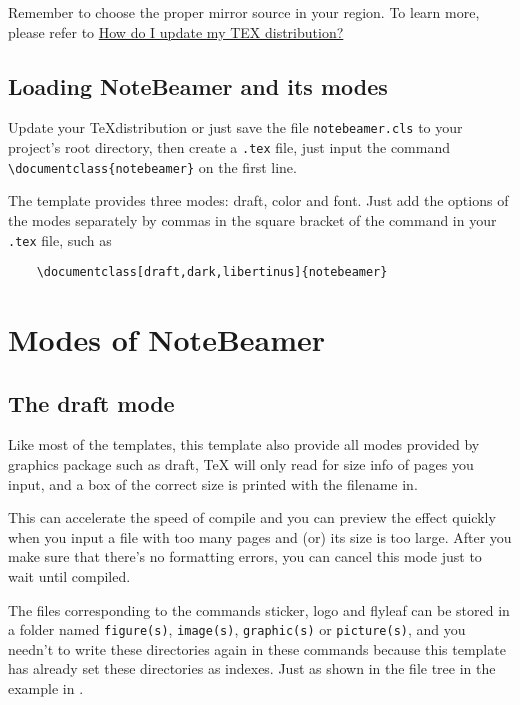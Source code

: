 \documentclass[11pt]{article}
\makeatletter
\def\@pkg#1{\texorpdfstring{\href{https://www.ctan.org/pkg/#1}{\textcolor{pkgcolor}{\textsf{#1}}}}{“#1”}}
\def\s@pkg#1{\texorpdfstring{\textcolor{pkgcolor}{\textsf{#1}}}{“#1”}}
\DeclareRobustCommand\pkg{\@ifstar\s@pkg\@pkg}
\def\mode#1{\texorpdfstring{\textcolor{moducolor}{\textsf{#1}}}{“#1”}}
\def\cmd#1{\texorpdfstring{\textcolor{cmdcolor}{\textsf{#1}}}{“#1”}}
\makeatother
\begin{document}
Remember to choose the proper mirror source in your region. To learn more, please refer to \href{https://tex.stackexchange.com/questions/55437/how-do-i-update-my-tex-distribution}{How do I update my TEX distribution?}

\subsection{Loading \pkg{NoteBeamer} and its modes}
Update your \sffamily\TeX distribution or just save the file \verb|notebeamer.cls| to your project's root directory, then create a \verb|.tex| file, just input the command \verb|\documentclass{notebeamer}| on the first line.

The template provides three modes: \mode{draft}, \mode{color} and \mode{font}. Just add the options of the modes separately by commas in the square bracket of the command in your \verb|.tex| file, such as

\begin{verbatim}
    \documentclass[draft,dark,libertinus]{notebeamer}
\end{verbatim}

\section{Modes of \pkg{NoteBeamer}}


\subsection{The \mode{draft} mode}
Like most of the templates, this template also provide all modes provided by \pkg{graphics} package such as \mode{draft}, \sffamily\TeX{} will only read for size info of pages you input, and a box of the correct size is printed with the filename in.

This can accelerate the speed of compile and you can preview the effect quickly when you input a file with too many pages and (or) its size is too large. After you make sure that there's no formatting errors, you can cancel this mode just to wait until compiled.

The files corresponding to the commands \cmd{sticker}, \cmd{logo} and \cmd{flyleaf} can be stored in a folder named \verb|figure(s)|, \verb|image(s)|, \verb|graphic(s)| or \verb|picture(s)|, and you needn't to write these directories again in these commands because this template has already set these directories as indexes. Just as shown in the file tree in the example in .
\end{document}
